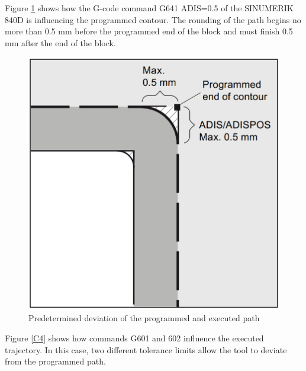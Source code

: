 Figure \ref{C3} shows how the G-code command G641 ADIS=0.5 of the SINUMERIK 840D is influencing the programmed contour. The rounding of the path begins no more than 0.5 mm before the programmed end of the block and must finish 0.5 mm after the end of the block. 
 
 \begin{figure}[H]
 	\centerline{\includegraphics[scale=.25]{figures/conti2.png}}
 	\caption{Predetermined deviation of the programmed and executed path~\cite{sinumericmanual}}
 	\label{C3}
 \end{figure}

Figure \ref{C4} shows how commands G601 and 602 influence the executed trajectory. In this case, two different tolerance limits allow the tool to deviate from the programmed path.
 
